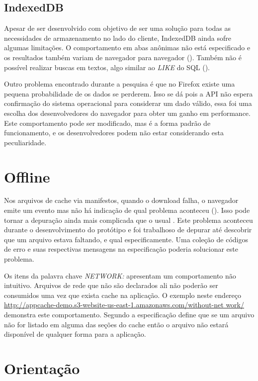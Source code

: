 \subsection{IndexedDB}

Apesar de ser desenvolvido com objetivo de ser uma solução para
todas as necessidades de armazenamento no lado do cliente, IndexedDB ainda
sofre algumas limitações. O comportamento em abas anônimas não
está especificado e os resultados também variam de navegador para
navegador (). Também não é
possível realizar buscas em textos, algo similar ao \textit{LIKE} do
SQL ().

Outro problema encontrado durante a pesquisa é que no Firefox existe
uma pequena probabilidade de os dados se perderem. Isso se dá pois a
API não espera confirmação do sistema operacional para considerar um
dado válido, essa foi uma escolha dos desenvolvedores do navegador para
obter um ganho em performance. Este comportamento pode ser modificado,
mas é a forma padrão de funcionamento, e os desenvolvedores podem não
estar considerando esta peculiaridade.

\section{Offline}

Nos arquivos de cache via manifestos, quando o download falha, o
navegador emite um evento mas não há indicação de qual problema
aconteceu (). Isso pode tornar a
depuração ainda mais complicada que o usual \textsc{\autocite{diveIntohtml}}.
Este problema aconteceu durante o desenvolvimento do protótipo e foi
trabalhoso de depurar até descobrir que um arquivo estava faltando,
e qual especificamente. Uma coleção de códigos de erro e suas
respectivas mensagens na especificação poderia solucionar este
problema.

Os itens da palavra chave \textit{NETWORK:} apresentam um
comportamento não intuitivo. Arquivos de rede que não
são declarados ali não poderão ser consumidos uma vez
que exista cache na aplicação. O exemplo neste endereço
\url{http://appcache-demo.s3-website-us-east-1.amazonaws.com/without-net
work/} demonstra este comportamento. Segundo \citet{gameAssetManagement}
a especificação define que se um arquivo não for listado em alguma
das seções do cache então o arquivo não estará disponível de
qualquer forma para a aplicação.

\section{Orientação}

